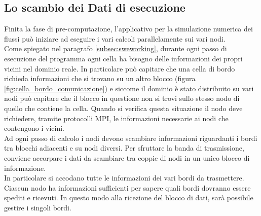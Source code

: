 \subsection{Lo scambio dei Dati di esecuzione}
Finita la fase di pre-computazione, l'applicativo per la simulazione numerica dei flussi può iniziare ad eseguire i vari calcoli parallelamente sui vari nodi.\\
Come spiegato nel paragrafo \ref{subsec:sweworking}, durante ogni passo di esecuzione del programma ogni cella ha bisogno delle informazioni dei propri vicini nel dominio reale. In particolare può capitare che una cella di bordo richieda informazioni che si trovano su un altro blocco (figura \ref{fig:cella_bordo_comunicazione}) e siccome il dominio è stato distribuito su vari nodi può capitare che il blocco in questione non si trovi sullo stesso nodo di quello che contiene la cella.
Quando si verifica questa situazione il nodo deve richiedere, tramite protocolli MPI, le informazioni necessarie ai nodi che contengono i vicini.\\
Ad ogni passo di calcolo i nodi devono scambiare informazioni riguardanti i bordi tra blocchi adiacenti e su nodi diversi. Per sfruttare la banda di trasmissione, conviene accorpare i dati da scambiare tra coppie di nodi in un unico blocco di informazione.\\
In particolare si accodano tutte le informazioni dei vari bordi da trasmettere. Ciascun nodo ha informazioni sufficienti per sapere quali bordi dovranno essere spediti e ricevuti. In questo modo alla ricezione del blocco di dati, sarà possibile gestire i singoli bordi.\\

